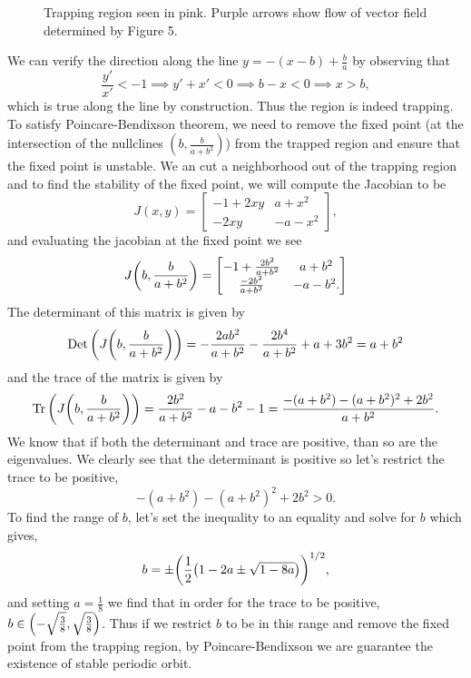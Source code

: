 \documentclass[12pt]{report}
\begin{document}
\begin{solution}
\begin{figure}[H]
        \caption{Trapping region seen in pink. Purple arrows show flow of vector field determined by Figure 5.}
    \end{figure} 
    We can verify the direction along the line $y = -(x-b) + \frac{b}{a}$ by observing that
    \[
        \frac{y'}{x'} < -1 \implies y' + x' < 0 \implies b - x < 0 \implies x > b,
    \]
    which is true along the line by construction. Thus the region is indeed trapping. To satisfy Poincare-Bendixson theorem, we need to remove the fixed point (at the intersection of the nullclines $(b,\frac{b}{a+b^2})$) from the trapped region and ensure that the fixed point is unstable. We an cut a neighborhood out of the trapping region and to find the stability of the fixed point, we will compute the Jacobian to be
    \[
         J(x,y) = \begin{bmatrix}
            -1 + 2xy & a + x^2\\
            -2xy & -a - x^2
         \end{bmatrix},
    \]
    and evaluating the jacobian at the fixed point we see
    \[ 
        J{\left(b,\frac{b}{a+b^2}\right)} = \begin{bmatrix}
            -1 + \frac{2b^2}{a + b^2} & a + b^2\\
            \frac{-2b^2}{a + b^2} & - a - b^2.
        \end{bmatrix}
    \]
    The determinant of this matrix is given by
    \[ 
        \text{Det}\left( J{\left(b,\frac{b}{a+b^2}\right)} \right) = -\frac{2 a b^2}{a+b^2}-\frac{2 b^4}{a+b^2}+a+3 b^2 = a + b^2
    \]
    and the trace of the matrix is given by 
    \[ 
        \text{Tr}\left( J{\left(b,\frac{b}{a+b^2}\right)} \right) = \frac{2 b^2}{a+b^2}-a-b^2-1 = \frac{-(a+b^2) - (a + b^2)^2 + 2b^2}{a + b^2}.
    \]
    We know that if both the determinant and trace are positive, than so are the eigenvalues. We clearly see that the determinant is positive so let's restrict the trace to be positive,  
    \[ 
        -(a+b^2) - (a + b^2)^2 + 2b^2 > 0.
    \]
    To find the range of $b$, let's set the inequality to an equality and solve for $b$ which gives,
    \[ 
        b = \pm {\left( \frac{1}{2} {\left(1 - 2a \pm \sqrt{1 - 8 a}\right)}\right)}^{1/2},
    \]
    and setting $a = \frac{1}{8}$ we find that in order for the trace to be positive, $b \in {\left(-\sqrt{\frac{3}{8}},\sqrt{\frac{3}{8}}\right)}$. Thus if we restrict $b$ to be in this range and remove the fixed point from the trapping region, by Poincare-Bendixson we are guarantee the existence of stable periodic orbit.



\end{solution}
\end{document}
